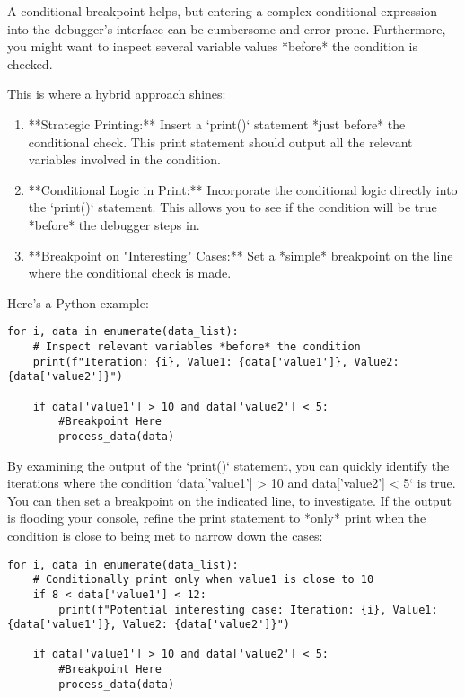 \documentclass{article}
\begin{document}
{{{A conditional breakpoint helps, but entering a complex conditional expression into the debugger's interface can be cumbersome and error-prone. Furthermore, you might want to inspect several variable values *before* the condition is checked.

This is where a hybrid approach shines:

\begin{enumerate}
    \item **Strategic Printing:** Insert a `print()` statement *just before* the conditional check. This print statement should output all the relevant variables involved in the condition.
    \item **Conditional Logic in Print:** Incorporate the conditional logic directly into the `print()` statement.  This allows you to see if the condition will be true *before* the debugger steps in.
    \item **Breakpoint on "Interesting" Cases:**  Set a *simple* breakpoint on the line where the conditional check is made.
\end{enumerate}

Here's a Python example:

\begin{verbatim}
for i, data in enumerate(data_list):
    # Inspect relevant variables *before* the condition
    print(f"Iteration: {i}, Value1: {data['value1']}, Value2: {data['value2']}")

    if data['value1'] > 10 and data['value2'] < 5:
        #Breakpoint Here
        process_data(data)
\end{verbatim}

By examining the output of the `print()` statement, you can quickly identify the iterations where the condition `data['value1'] > 10 and data['value2'] < 5` is true. You can then set a breakpoint on the indicated line, to investigate.  If the output is flooding your console, refine the print statement to *only* print when the condition is close to being met to narrow down the cases:

\begin{verbatim}
for i, data in enumerate(data_list):
    # Conditionally print only when value1 is close to 10
    if 8 < data['value1'] < 12:
        print(f"Potential interesting case: Iteration: {i}, Value1: {data['value1']}, Value2: {data['value2']}")

    if data['value1'] > 10 and data['value2'] < 5:
        #Breakpoint Here
        process_data(data)
\end{verbatim}

}}}
\end{document}

